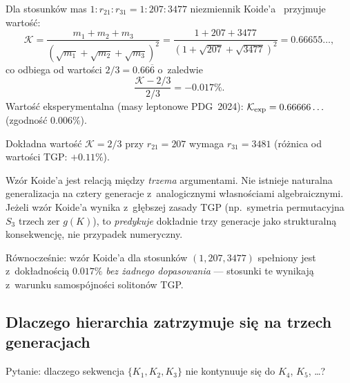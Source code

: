 \begin{proposition}%
\label{prop:koide}
Dla stosunków mas $1 : r_{21} : r_{31} = 1 : 207 : 3477$
niezmiennik Koide'a~\cite{Koide1983} przyjmuje wartość:
\begin{equation}\label{eq:koide}
    \mathcal{K}
    = \frac{m_1 + m_2 + m_3}{(\sqrt{m_1} + \sqrt{m_2} + \sqrt{m_3})^2}
    = \frac{1 + 207 + 3477}{(1 + \sqrt{207} + \sqrt{3477})^2}
    = 0.66655\ldots,
\end{equation}
co odbiega od wartości $2/3 = 0.66\overline{6}$ o~zaledwie
\begin{equation}
    \frac{\mathcal{K} - 2/3}{2/3} = -0.017\%.
\end{equation}
Wartość eksperymentalna (masy leptonowe PDG~2024):
$\mathcal{K}_{\rm exp} = 0.66666\ldots$ (zgodność $0.006\%$).

Dokładna wartość $\mathcal{K} = 2/3$ przy $r_{21} = 207$
wymaga $r_{31} = 3481$ (różnica od wartości TGP: $+0.11\%$).
\end{proposition}

\begin{remark}%
\label{rem:koide-znaczenie}
Wzór Koide'a jest relacją między \emph{trzema} argumentami.
Nie istnieje naturalna generalizacja na cztery generacje z~analogicznymi
własnościami algebraicznymi. Jeżeli wzór Koide'a wynika z~głębszej
zasady TGP (np.\ symetria permutacyjna $S_3$ trzech zer $g(K)$),
to \emph{predykuje} dokładnie trzy generacje jako strukturalną
konsekwencję, nie przypadek numeryczny.

Równocześnie: wzór Koide'a dla stosunków $(1, 207, 3477)$
spełniony jest z~dokładnością $0.017\%$ \emph{bez żadnego dopasowania} ---
stosunki te wynikają z~warunku samospójności solitonów TGP.
\end{remark}

\subsection{Dlaczego hierarchia zatrzymuje się na trzech generacjach}%
\label{app:I-trzy}

Pytanie: dlaczego sekwencja $\{K_1, K_2, K_3\}$ nie kontynuuje się
do $K_4$, $K_5$, \ldots?

